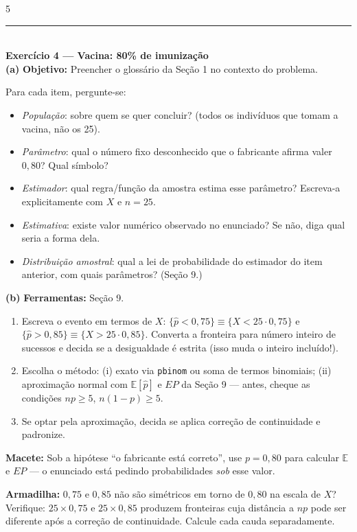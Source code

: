 \documentclass[a4paper,8pt]{extarticle}
\newcommand{\tit}[1]{\vspace{2pt}\textcolor{azul}{\rule{\linewidth}{0.6pt}}\\[1pt]\textbf{\textcolor{azul}{#1}}\\[1pt]}
\newcommand{\mac}[1]{\textcolor{verde}{\textbf{Macete:}} #1\par}
\newcommand{\arm}[1]{\textcolor{vinho}{\textbf{Armadilha:}} #1\par}
\newcommand{\ferr}[1]{\textbf{Ferramentas:} #1\par}
\newcommand{\obj}[1]{\textbf{Objetivo:} #1\par}
\newcommand{\E}{\mathbb{E}}
\newcommand{\R}[1]{\texttt{\footnotesize #1}}
\begin{document}
\begin{multicols*}{5}
\tit{Exercício 4 — Vacina: 80\% de imunização}
\textbf{(a)} \obj{Preencher o glossário da Seção 1 no contexto do problema.}
Para cada item, pergunte-se:
\begin{itemize}
\item \emph{População}: sobre quem se quer concluir? (todos os indivíduos que tomam a vacina, não os 25).
\item \emph{Parâmetro}: qual o número fixo desconhecido que o fabricante afirma valer $0{,}80$? Qual símbolo?
\item \emph{Estimador}: qual regra/função da amostra estima esse parâmetro? Escreva-a explicitamente com $X$ e $n=25$.
\item \emph{Estimativa}: existe valor numérico observado no enunciado? Se não, diga qual seria a forma dela.
\item \emph{Distribuição amostral}: qual a lei de probabilidade do estimador do item anterior, com quais parâmetros? (Seção 9.)
\end{itemize}
\textbf{(b)} \ferr{Seção 9.}
\begin{enumerate}
\item Escreva o evento em termos de $X$: $\{\hat p<0{,}75\}\equiv\{X<25\cdot0{,}75\}$ e $\{\hat p>0{,}85\}\equiv\{X>25\cdot0{,}85\}$. Converta a fronteira para número inteiro de sucessos e decida se a desigualdade é estrita (isso muda o inteiro incluído!).
\item Escolha o método: (i) exato via \R{pbinom} ou soma de termos binomiais; (ii) aproximação normal com $\E[\hat p]$ e $EP$ da Seção 9 — antes, cheque as condições $np\ge5$, $n(1-p)\ge5$.
\item Se optar pela aproximação, decida se aplica correção de continuidade e padronize.
\end{enumerate}
\mac{Sob a hipótese “o fabricante está correto”, use $p=0{,}80$ para calcular $\E$ e $EP$ — o enunciado está pedindo probabilidades \emph{sob} esse valor.}
\arm{$0{,}75$ e $0{,}85$ não são simétricos em torno de $0{,}80$ na escala de $X$? Verifique: $25\times0{,}75$ e $25\times0{,}85$ produzem fronteiras cuja distância a $np$ pode ser diferente após a correção de continuidade. Calcule cada cauda separadamente.}


\end{multicols*}
\end{document}
